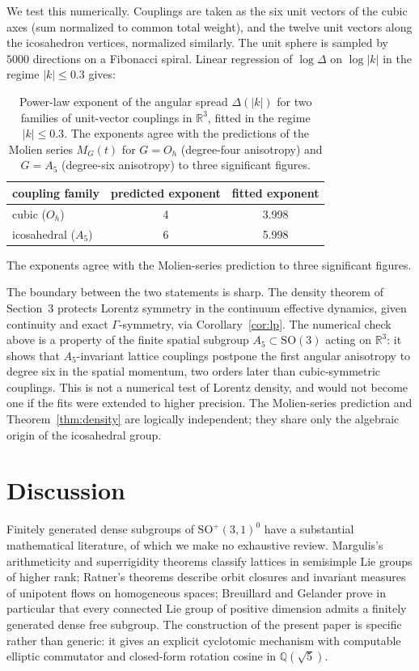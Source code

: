 \documentclass[11pt]{article}
\theoremstyle{remark}
\begin{document}
We test this numerically. Couplings are taken as the six unit vectors
of the cubic axes (sum normalized to common total weight), and the
twelve unit vectors along the icosahedron vertices, normalized
similarly. The unit sphere is sampled by $5000$ directions on a
Fibonacci spiral. Linear regression of $\log\Delta$ on $\log|k|$ in
the regime $|k| \leq 0.3$ gives:

\begin{table}[ht]
\centering
\begin{tabular}{|l|c|c|}
\hline
coupling family & predicted exponent & fitted exponent \\
\hline
cubic ($O_h$)        & 4 & 3.998 \\
icosahedral ($A_5$)  & 6 & 5.998 \\
\hline
\end{tabular}
\caption{Power-law exponent of the angular spread $\Delta(|k|)$ for
two families of unit-vector couplings in $\mathbb{R}^3$, fitted in
the regime $|k| \leq 0.3$. The exponents agree with the predictions
of the Molien series $M_G(t)$ for $G = O_h$ (degree-four anisotropy)
and $G = A_5$ (degree-six anisotropy) to three significant figures.}
\end{table}

The exponents agree with the Molien-series prediction to three
significant figures.

The boundary between the two statements is sharp. The density theorem
of Section~3 protects Lorentz symmetry in the continuum effective
dynamics, given continuity and exact $\Gamma$-symmetry, via
Corollary~\ref{cor:lp}. The numerical check above is a property of
the finite spatial subgroup $A_5 \subset \mathrm{SO}(3)$ acting on
$\mathbb{R}^3$: it shows that $A_5$-invariant lattice couplings
postpone the first angular anisotropy to degree six in the spatial
momentum, two orders later than cubic-symmetric couplings. This is
not a numerical test of Lorentz density, and would not become one if
the fits were extended to higher precision. The Molien-series
prediction and Theorem~\ref{thm:density} are logically independent;
they share only the algebraic origin of the icosahedral group.


\section{Discussion}

Finitely generated dense subgroups of $\mathrm{SO}^+(3,1)^0$ have a
substantial mathematical literature, of which we make no exhaustive
review. Margulis's arithmeticity and superrigidity theorems
\cite{Margulis91} classify lattices in semisimple Lie groups of higher
rank; Ratner's theorems \cite{Ratner91} describe orbit closures and
invariant measures of unipotent flows on homogeneous spaces;
Breuillard and Gelander \cite{BG03} prove in particular that every
connected Lie group of positive dimension admits a finitely generated
dense free subgroup. The construction of the present paper is
specific rather than generic: it gives an explicit cyclotomic
mechanism with computable elliptic commutator and closed-form
rotation cosine in $\mathbb{Q}(\sqrt{5})$.
\end{document}
